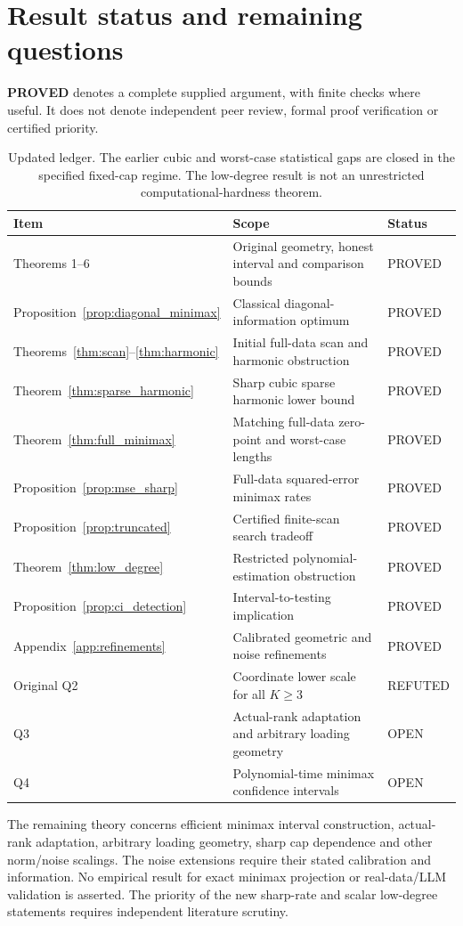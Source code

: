 
\section{Result status and remaining questions}\label{sec:status}
\textbf{PROVED} denotes a complete supplied argument, with finite checks where useful. It does not denote independent peer review, formal proof verification or certified priority.

\begin{table}[ht]
\centering\small
\begin{tabularx}{\textwidth}{@{}lYl@{}}
\toprule Item & Scope & Status\\\midrule
Theorems 1--6 & Original geometry, honest interval and comparison bounds & PROVED\\
Proposition~\ref{prop:diagonal_minimax} & Classical diagonal-information optimum & PROVED\\
Theorems~\ref{thm:scan}--\ref{thm:harmonic} & Initial full-data scan and harmonic obstruction & PROVED\\
Theorem~\ref{thm:sparse_harmonic} & Sharp cubic sparse harmonic lower bound & PROVED\\
Theorem~\ref{thm:full_minimax} & Matching full-data zero-point and worst-case lengths & PROVED\\
Proposition~\ref{prop:mse_sharp} & Full-data squared-error minimax rates & PROVED\\
Proposition~\ref{prop:truncated} & Certified finite-scan search tradeoff & PROVED\\
Theorem~\ref{thm:low_degree} & Restricted polynomial-estimation obstruction & PROVED\\
Proposition~\ref{prop:ci_detection} & Interval-to-testing implication & PROVED\\
Appendix~\ref{app:refinements} & Calibrated geometric and noise refinements & PROVED\\
Original Q2 & Coordinate lower scale for all $K\ge3$ & REFUTED\\
Q3 & Actual-rank adaptation and arbitrary loading geometry & OPEN\\
Q4 & Polynomial-time minimax confidence intervals & OPEN\\
\bottomrule
\end{tabularx}
\caption{Updated ledger. The earlier cubic and worst-case statistical gaps are closed in the specified fixed-cap regime. The low-degree result is not an unrestricted computational-hardness theorem.}\label{tab:status}
\end{table}

The remaining theory concerns efficient minimax interval construction, actual-rank adaptation, arbitrary loading geometry, sharp cap dependence and other norm/noise scalings. The noise extensions require their stated calibration and information. No empirical result for exact minimax projection or real-data/LLM validation is asserted. The priority of the new sharp-rate and scalar low-degree statements requires independent literature scrutiny.
